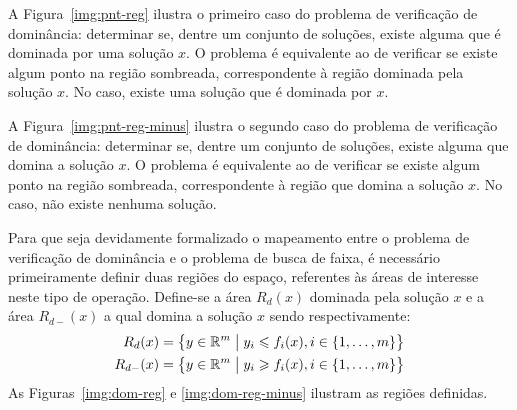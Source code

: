 A Figura~\ref{img:pnt-reg} ilustra o primeiro caso do problema de verificação de dominância:
determinar se, dentre um conjunto de soluções, existe alguma que é dominada por uma solução $x$.
O problema é equivalente ao de verificar se existe algum ponto na região sombreada,
correspondente à região dominada pela solução $x$.
No caso, existe uma solução que é dominada por $x$.

A Figura~\ref{img:pnt-reg-minus} ilustra o segundo caso do problema de verificação de dominância:
determinar se, dentre um conjunto de soluções, existe alguma que domina a solução $x$.
O problema é equivalente ao de verificar se existe algum ponto na região sombreada,
correspondente à região que domina a solução $x$.
No caso, não existe nenhuma solução.

Para que seja devidamente formalizado o mapeamento entre o problema de verificação
de dominância e o problema de busca de faixa, é necessário primeiramente definir
duas regiões do espaço, referentes às áreas de interesse neste tipo de operação.
Define-se a área $R_d(x)$ dominada pela solução $x$ e a área $R_{d-}(x)$ a qual domina
a solução $x$ sendo respectivamente:
\begin{align*}
  R_d(x) &= \big\{y \in \mathbb{R}^m \;\big|\; y_i \leqslant f_i(x), i \in \{1, \ldots, m\}\big\}\\
  R_{d-}(x) &= \big\{y \in \mathbb{R}^m \;\big|\; y_i \geqslant f_i(x), i \in \{1, \ldots, m\}\big\}
\end{align*}
\noindent As Figuras~\ref{img:dom-reg} e \ref{img:dom-reg-minus} ilustram as
regiões definidas.

